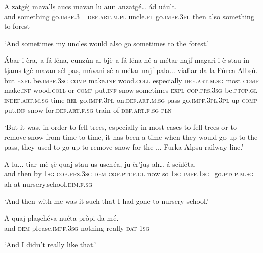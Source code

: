 \begin{linenumbers}
\gll   A zatgéj mava'lṣ aucs mavan lu aun anzatgé… ád uáult. \\
 and something go.\textsc{impf.3}= \textsc{def.art.m.pl} uncle.\textsc{pl}  go.\textsc{impf.3pl} then also something to forest \\
\end{linenumbers}
\medskip
\glt `And sometimes my uncles would also go sometimes to the forest.'
\medskip

\begin{linenumbers}
\gll   Ábar i èra, a fá léna, cunzún al bjè a fá léna né a métar najf magari i è stau in tjams tgé mavan sél pas, mávani sé a métar najf pala... viafiar da la Fùrca-Albṣù. \\
but \textsc{expl} be.\textsc{impf.3sg} \textsc{comp} make.\textsc{inf} wood.\textsc{coll} especially \textsc{def.art.m.sg} most \textsc{comp} make.\textsc{inf} wood.\textsc{coll} or \textsc{comp} put.\textsc{inf} snow sometimes \textsc{expl} \textsc{cop.prs.3sg} be.\textsc{ptcp.gl} \textsc{indef.art.m.sg} time \textsc{rel} go.\textsc{impf.3pl} on.\textsc{def.art.m.sg} pass go.\textsc{impf.3pl.3pl} up \textsc{comp} put.\textsc{inf} snow for.\textsc{def.art.f.sg} train of \textsc{def.art.f.sg} \textsc{pln}   \\
\end{linenumbers}
\medskip
\glt `But it was, in order to fell trees, especially in most cases to fell trees or to remove snow from time to time, it has been a time when they would go up to the pass, they used to go up to remove snow for the ... Furka-Alpsu railway line.'
\medskip

\begin{linenumbers}
\gll  A lu... tiar mè ṣè quaj stau us uschéa, ju èr’juṣ ah… á scùléta.  \\
 and then by \textsc{1sg} \textsc{cop.prs.3sg} \textsc{dem} \textsc{cop.ptcp.gl} now so \textsc{1sg}  \textsc{impf.1sg=}go.\textsc{ptcp.m.sg} ah at nursery.school.\textsc{dim.f.sg} \\
\end{linenumbers}
\medskip
\glt `And then with me was it such that I had gone to nursery school.'
\medskip

\begin{linenumbers}
\gll A quaj plaṣchéva nuéta pròpi da mé. \\
and \textsc{dem} please.\textsc{impf.3sg} nothing really \textsc{dat} \textsc{1sg}   \\
\end{linenumbers}
\medskip
\glt `And I didn’t really like that.'
\medskip

